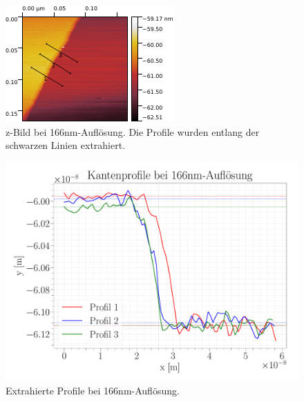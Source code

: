 \begin{figure}[H]
\centering
\includegraphics[width=\textwidth]{../Gwyddion/HOPG/166nm.pdf}
\caption{z-Bild bei {166}{nm}-Auflösung. Die Profile wurden entlang der schwarzen Linien extrahiert.}
\label{166nm}
\end{figure}

\begin{figure}[H]
\centering
\includegraphics[width=\textwidth]{../Figures/166nm_profiles.pdf}
\caption{Extrahierte Profile bei {166}{nm}-Auflösung.}
\label{166nmProfiles}
\end{figure}

